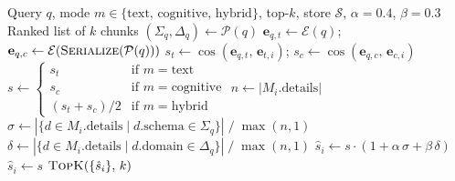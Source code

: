 \documentclass[11pt,a4paper]{article}
\begin{document}
\begin{algorithm}[h]
\caption{IS-RAG Retrieval}\label{alg:retrieve}
\begin{algorithmic}[1]
\Require Query $q$, mode $m \in \{\text{text, cognitive, hybrid}\}$,
         top-$k$, store $\mathcal{S}$, $\alpha{=}0.4$, $\beta{=}0.3$
\Ensure  Ranked list of $k$ chunks
\State $(\Sigma_q, \Delta_q) \gets \mathcal{P}(q)$
\State $\mathbf{e}_{q,t} \gets \mathcal{E}(q)$;\;
       $\mathbf{e}_{q,c} \gets \mathcal{E}(\textsc{Serialize}(\mathcal{P}(q)))$
  \State $s_t \gets \cos(\mathbf{e}_{q,t},\,\mathbf{e}_{t,i})$;\;
         $s_c \gets \cos(\mathbf{e}_{q,c},\,\mathbf{e}_{c,i})$
  \State $s \gets \begin{cases}
    s_t & \text{if } m = \text{text} \\
    s_c & \text{if } m = \text{cognitive} \\
    (s_t + s_c)/2 & \text{if } m = \text{hybrid}
  \end{cases}$
  \State $n \gets |M_i.\text{details}|$
  \State $\sigma \gets |\{d \in M_i.\text{details} \mid d.\text{schema} \in \Sigma_q\}|
                       \;/\; \max(n,1)$
  \State $\delta \gets |\{d \in M_i.\text{details} \mid d.\text{domain} \in \Delta_q\}|
                       \;/\; \max(n,1)$
    \State $\hat{s}_i \gets s \cdot (1 + \alpha\,\sigma + \beta\,\delta)$
  \Else
    \State $\hat{s}_i \gets s$
  \EndIf
\EndFor
\State \Return $\textsc{TopK}(\{\hat{s}_i\},\,k)$
\end{algorithmic}
\end{algorithm}
\end{document}
